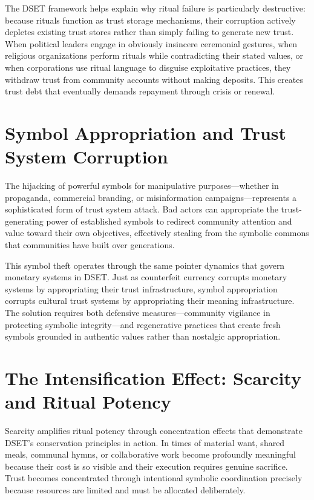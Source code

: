 \documentclass[11pt,oneside]{book}
\begin{document}
The DSET framework helps explain why ritual failure is particularly destructive: because rituals function as trust storage mechanisms, their corruption actively depletes existing trust stores rather than simply failing to generate new trust. When political leaders engage in obviously insincere ceremonial gestures, when religious organizations perform rituals while contradicting their stated values, or when corporations use ritual language to disguise exploitative practices, they withdraw trust from community accounts without making deposits. This creates trust debt that eventually demands repayment through crisis or renewal.

\section{Symbol Appropriation and Trust System Corruption}

The hijacking of powerful symbols for manipulative purposes—whether in propaganda, commercial branding, or misinformation campaigns—represents a sophisticated form of trust system attack. Bad actors can appropriate the trust-generating power of established symbols to redirect community attention and value toward their own objectives, effectively stealing from the symbolic commons that communities have built over generations.

This symbol theft operates through the same pointer dynamics that govern monetary systems in DSET. Just as counterfeit currency corrupts monetary systems by appropriating their trust infrastructure, symbol appropriation corrupts cultural trust systems by appropriating their meaning infrastructure. The solution requires both defensive measures—community vigilance in protecting symbolic integrity—and regenerative practices that create fresh symbols grounded in authentic values rather than nostalgic appropriation.
\section{The Intensification Effect: Scarcity and Ritual Potency}

Scarcity amplifies ritual potency through concentration effects that demonstrate DSET's conservation principles in action. In times of material want, shared meals, communal hymns, or collaborative work become profoundly meaningful because their cost is so visible and their execution requires genuine sacrifice. Trust becomes concentrated through intentional symbolic coordination precisely because resources are limited and must be allocated deliberately.
\end{document}
